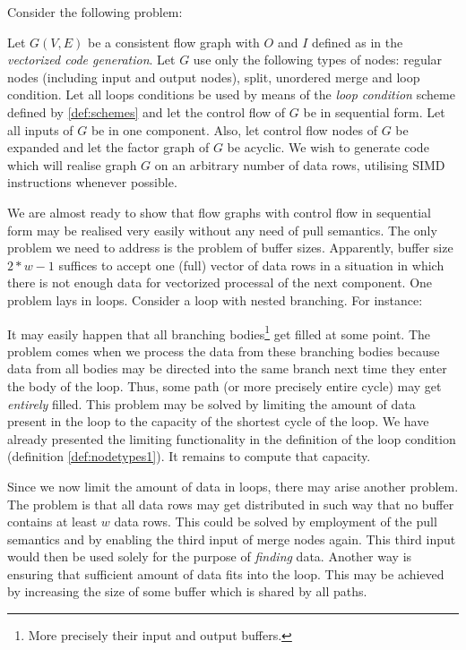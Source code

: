 
Consider the following problem:

      Let $G(V,E)$ be a consistent flow graph with $O$ and $I$ defined as in the \emph{vectorized code generation}. Let $G$ use only the following types of nodes: regular nodes (including input and output nodes), split, unordered merge and loop condition. Let all loops conditions be used by means of the \emph{loop condition} scheme defined by \ref{def:schemes} and let the control flow of $G$ be in sequential form. Let all inputs of $G$ be in one component. Also, let control flow nodes of $G$ be expanded and let the factor graph of $G$ be acyclic. We wish to generate code which will realise graph $G$ on an arbitrary number of data rows, utilising SIMD instructions whenever possible. 
\myendprob

  We are almost ready to show that flow graphs with control flow in sequential form may be realised very easily without any need of pull semantics. The only problem we need to address is the problem of buffer sizes. Apparently, buffer size $2*w-1$ suffices to accept one (full) vector of data rows in a situation in which there is not enough data for vectorized processal of the next component. One problem lays in loops.  Consider a loop with nested branching. For instance:


  It may easily happen that all branching bodies\footnote{More precisely their input and output buffers.} get filled at some point. The problem comes when we process the data from these branching bodies because data from all bodies may be directed into the same branch next time they enter the body of the loop. Thus, some path (or more precisely entire cycle) may get \emph{entirely} filled. This problem may be solved by limiting the amount of data present in the loop to the capacity of the shortest cycle of the loop. We have already presented the limiting functionality in the definition of the loop condition (definition \ref{def:nodetypes1}). It remains to compute that capacity.

  Since we now limit the amount of data in loops, there may arise another problem. The problem is that all data rows may get distributed in such way that no buffer contains at least $w$ data rows. This could be solved by employment of the pull semantics and by enabling the third input of merge nodes again. This third input would then be used solely for the purpose of \emph{finding} data. Another way is ensuring that sufficient amount of data fits into the loop. This may be achieved by increasing the size of some buffer which is shared by all paths.

